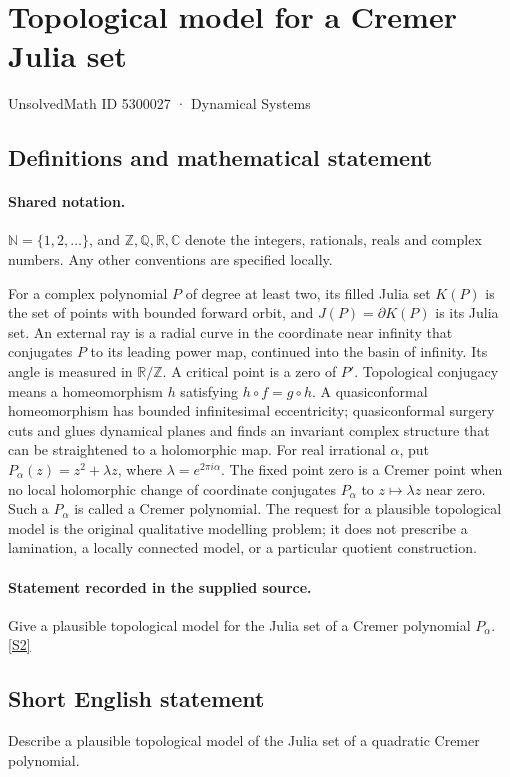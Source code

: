 \documentclass[11pt]{article}
\newcommand{\sref}[2]{\hyperlink{source:#1:#2}{[S#2]}}
\begin{document}
\setcounter{section}{5300026}
\section{Topological model for a Cremer Julia set}\label{5300027}
{\small\sffamily UnsolvedMath ID 5300027 · Dynamical Systems}
\subsection{Definitions and mathematical statement}

\paragraph{Shared notation.}$\mathbb N=\{1,2,\ldots\}$, and $\mathbb Z,\mathbb Q,\mathbb R,\mathbb C$ denote the integers, rationals, reals and complex numbers. Any other conventions are specified locally.


For a complex polynomial $P$ of degree at least two, its filled Julia set $K(P)$ is the set of points with bounded forward orbit, and $J(P)=\partial K(P)$ is its Julia set. An external ray is a radial curve in the coordinate near infinity that conjugates $P$ to its leading power map, continued into the basin of infinity. Its angle is measured in $\mathbb R/\mathbb Z$. A critical point is a zero of $P'$. Topological conjugacy means a homeomorphism $h$ satisfying $h\circ f=g\circ h$. A quasiconformal homeomorphism has bounded infinitesimal eccentricity; quasiconformal surgery cuts and glues dynamical planes and finds an invariant complex structure that can be straightened to a holomorphic map.
For real irrational $\alpha$, put $P_\alpha(z)=z^2+\lambda z$, where $\lambda=e^{2\pi i\alpha}$. The fixed point zero is a Cremer point when no local holomorphic change of coordinate conjugates $P_\alpha$ to $z\mapsto\lambda z$ near zero. Such a $P_\alpha$ is called a Cremer polynomial. The request for a plausible topological model is the original qualitative modelling problem; it does not prescribe a lamination, a locally connected model, or a particular quotient construction.
\paragraph{Statement recorded in the supplied source.}
Give a plausible topological model for the Julia set of a Cremer polynomial $P_\alpha$. \sref{5300027}{2}
\subsection{Short English statement}
Describe a plausible topological model of the Julia set of a quadratic Cremer polynomial.
\end{document}
